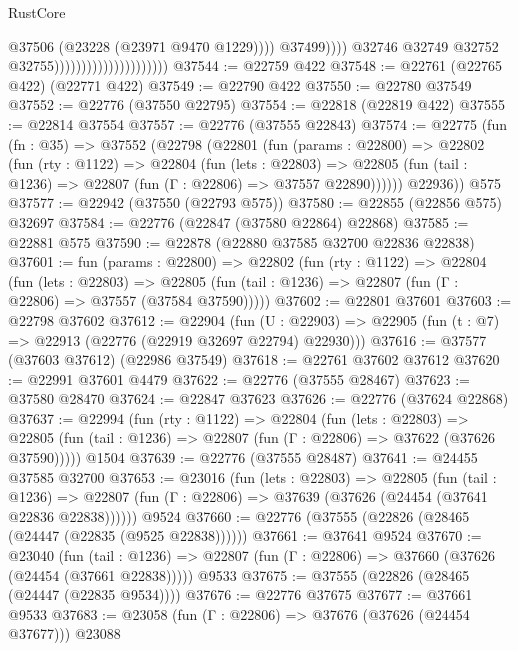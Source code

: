 \begin{lexlean}{RustCore}
\begin{coremodule}
                                                          @37506
                                                          (@23228 (@23971 @9470 @1229))))
                                                      @37499))))
                                              @32746
                                              @32749
                                              @32752
                                              @32755)))))))))))))))))))))
@37544 := @22759 @422
@37548 := @22761 (@22765 @422) (@22771 @422)
@37549 := @22790 @422
@37550 := @22780 @37549
@37552 := @22776 (@37550 @22795)
@37554 := @22818 (@22819 @422)
@37555 := @22814 @37554
@37557 := @22776 (@37555 @22843)
@37574 := @22775
    (fun (fn : @35) =>
    @37552
      (@22798
        (@22801
          (fun (params : @22800) =>
          @22802
            (fun (rty : @1122) =>
            @22804
              (fun (lets : @22803) =>
              @22805 (fun (tail : @1236) => @22807 (fun (Γ : @22806) => @37557 @22890))))))
        @22936))
    @575
@37577 := @22942 (@37550 (@22793 @575))
@37580 := @22855 (@22856 @575) @32697
@37584 := @22776 (@22847 (@37580 @22864) @22868)
@37585 := @22881 @575
@37590 := @22878 (@22880 @37585 @32700 @22836 @22838)
@37601 := fun (params : @22800) =>
  @22802
    (fun (rty : @1122) =>
    @22804
      (fun (lets : @22803) =>
      @22805 (fun (tail : @1236) => @22807 (fun (Γ : @22806) => @37557 (@37584 @37590)))))
@37602 := @22801 @37601
@37603 := @22798 @37602
@37612 := @22904
    (fun (U : @22903) => @22905 (fun (t : @7) => @22913 (@22776 (@22919 @32697 @22794) @22930)))
@37616 := @37577 (@37603 @37612) (@22986 @37549)
@37618 := @22761 @37602 @37612
@37620 := @22991 @37601 @4479
@37622 := @22776 (@37555 @28467)
@37623 := @37580 @28470
@37624 := @22847 @37623
@37626 := @22776 (@37624 @22868)
@37637 := @22994
    (fun (rty : @1122) =>
    @22804
      (fun (lets : @22803) =>
      @22805 (fun (tail : @1236) => @22807 (fun (Γ : @22806) => @37622 (@37626 @37590)))))
    @1504
@37639 := @22776 (@37555 @28487)
@37641 := @24455 @37585 @32700
@37653 := @23016
    (fun (lets : @22803) =>
    @22805
      (fun (tail : @1236) =>
      @22807 (fun (Γ : @22806) => @37639 (@37626 (@24454 (@37641 @22836 @22838))))))
    @9524
@37660 := @22776 (@37555 (@22826 (@28465 (@24447 (@22835 (@9525 @22838))))))
@37661 := @37641 @9524
@37670 := @23040
    (fun (tail : @1236) => @22807 (fun (Γ : @22806) => @37660 (@37626 (@24454 (@37661 @22838)))))
    @9533
@37675 := @37555 (@22826 (@28465 (@24447 (@22835 @9534))))
@37676 := @22776 @37675
@37677 := @37661 @9533
@37683 := @23058 (fun (Γ : @22806) => @37676 (@37626 (@24454 @37677))) @23088

\end{coremodule}
\end{lexlean}
